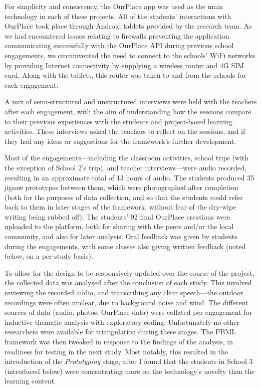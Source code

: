 For simplicity and consistency, the OurPlace app was used as the main technology in each of these projects. All of the students' interactions with OurPlace took place through Android tablets provided by the research team. As we had encountered issues relating to firewalls preventing the application communicating successfully with the OurPlace API during previous school engagements, we circumvented the need to connect to the schools' WiFi networks by providing Internet connectivity by supplying a wireless router and 4G SIM card. Along with the tablets, this router was taken to and from the schools for each engagement.

A mix of semi-structured and unstructured interviews were held with the teachers after each engagement, with the aim of understanding how the sessions compare to their previous experiences with the students and project-based learning activities. These interviews asked the teachers to reflect on the sessions, and if they had any ideas or suggestions for the framework's further development.

Most of the engagements---including the classroom activities, school trips (with the exception of School 2's trip), and teacher interviews---were audio recorded, resulting in an approximate total of 13 hours of audio. The students produced 35 jigsaw prototypes between them, which were photographed after completion (both for the purposes of data collection, and so that the students could refer back to them in later stages of the framework, without fear of the dry-wipe writing being rubbed off). The students' 92 final OurPlace creations were uploaded to the platform, both for sharing with the peers and/or the local community, and also for later analysis. Oral feedback was given by students during the engagements, with some classes also giving written feedback (noted below, on a per-study basis).

To allow for the design to be responsively updated over the course of the project, the collected data was analysed after the conclusion of each study. This involved reviewing the recorded audio, and transcribing any clear speech---the outdoor recordings were often unclear, due to background noise and wind. The different sources of data (audio, photos, OurPlace data) were collated per engagement for inductive thematic analysis with exploratory coding. Unfortunately no other researchers were available for triangulation during these stages. The PBML framework was then tweaked in response to the findings of the analysis, in readiness for testing in the next study. Most notably, this resulted in the introduction of the \textit{Prototyping} stage, after I found that the students in School 3 (introduced below) were concentrating more on the technology's novelty than the learning content.

